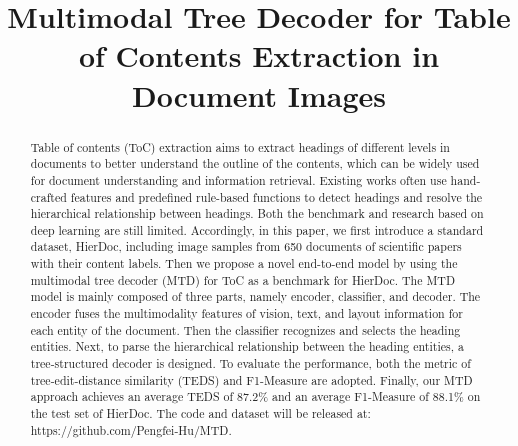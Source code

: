 \documentclass[a4paper,conference]{IEEEtran}
\begin{document}
\title{Multimodal Tree Decoder for Table of Contents Extraction in Document Images}



\author{
}

\maketitle
\begin{abstract}
Table of contents (ToC) extraction aims to extract headings of different levels in documents to better understand the outline of the contents, which can be widely used for document understanding and information retrieval. Existing works often use hand-crafted features and predefined rule-based functions to detect headings and resolve the hierarchical relationship between headings. Both the benchmark and research based on deep learning are still limited. Accordingly, in this paper, we first introduce a standard dataset, HierDoc, including image samples from 650 documents of scientific papers with their content labels. Then we propose a novel end-to-end model by using the multimodal tree decoder (MTD) for ToC as a benchmark for HierDoc. The MTD model is mainly composed of three parts, namely encoder, classifier, and decoder. The encoder fuses the multimodality features of vision, text, and layout information for each entity of the document. Then the classifier recognizes and selects the heading entities. Next, to parse the hierarchical relationship between the heading entities, a tree-structured decoder is designed. To evaluate the performance, both the metric of tree-edit-distance similarity (TEDS) and F1-Measure are adopted. Finally, our MTD approach achieves an average TEDS of 87.2\% and an average F1-Measure of 88.1\% on the test set of HierDoc. The code and dataset will be released at: https://github.com/Pengfei-Hu/MTD.


\end{abstract}
\end{document}
